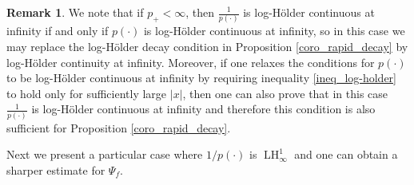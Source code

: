 \documentclass[11pt,reqno]{amsart}
\theoremstyle{definition}
\theoremstyle{definition}
\newtheorem{obs}{Remark}
\theoremstyle{definition}
\newcommand{\p}{p(\cdot)}
\newcommand{\LH}{\operatorname{LH}_\infty^1}
\begin{document}
\begin{obs}
    We note that if $p_{+}<\infty$, then $\frac{1}{\p}$ is log-Hölder continuous at infinity if and only if $\p$ is log-Hölder continuous at infinity, so in this case we may replace the log-Hölder decay condition in Proposition \ref{coro_rapid_decay} by log-Hölder continuity at infinity. Moreover, if one relaxes the conditions for $\p$ to be log-Hölder continuous at infinity by requiring inequality \eqref{ineq_log-holder} to hold only for sufficiently large $|x|$, then one can also prove that in this case $\frac{1}{\p}$ is log-Hölder continuous at infinity and therefore this condition is also sufficient for Proposition \ref{coro_rapid_decay}.
\end{obs}

Next we present a particular case where $1/\p$ is $\LH$ and one can obtain a sharper estimate for $\Psi_f$.
\end{document}
